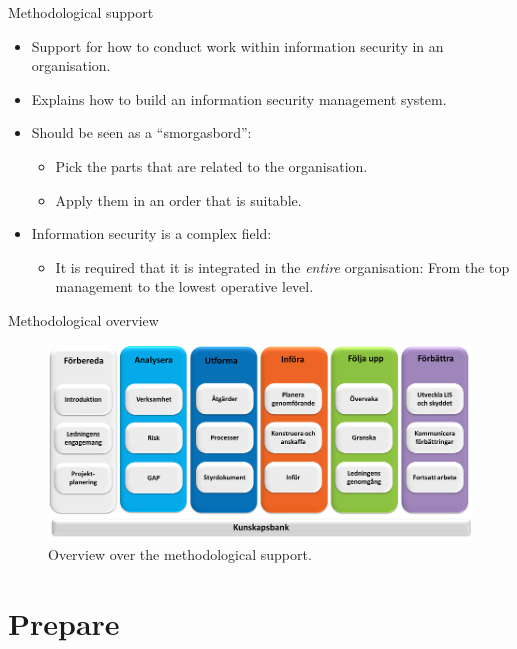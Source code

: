 \documentclass{beamer}
\begin{document}
\begin{frame}{Methodological support}
  \begin{itemize}
    \item Support for how to conduct work within information security in an
      organisation.

    \item Explains how to build an information security management system.

    \item Should be seen as a \enquote{smorgasbord}:
      \begin{itemize}
        \item Pick the parts that are related to the organisation.
        \item Apply them in an order that is suitable.
      \end{itemize}

    \item Information security is a complex field:
      \begin{itemize}
        \item It is required that it is integrated in the \emph{entire}
          organisation: From the top management to the lowest operative level.
      \end{itemize}

  \end{itemize}
\end{frame}

\begin{frame}{Methodological overview}
  \begin{figure}
    \includegraphics[width=\textwidth]{metodstod-overview.png}
    \caption{Overview over the methodological support.}
  \end{figure}
\end{frame}

\section{Prepare}
\end{document}
